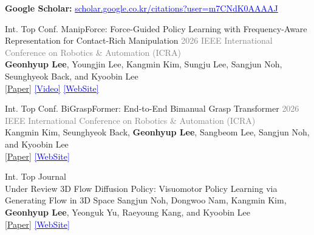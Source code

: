 \documentclass[9pt]{developercv} %
\begin{document}
\vspace{-10 pt} 
{\textbf{Google Scholar:} %
     \href{https://scholar.google.co.kr/citations?user=m7CNdK0AAAAJ\&hl=ko}%
     {\textcolor{blue}{scholar.google.co.kr/citations?user=m7CNdK0AAAAJ}}
\vspace{10 pt} 

\begin{entrylist}

    \entry
        {Int. Top Conf.}
        {ManipForce: Force-Guided Policy Learning with Frequency-Aware Representation for Contact-Rich Manipulation} 
        {}
        {\vspace{0pt}
        \textcolor{gray}{2026 IEEE International Conference on Robotics \& Automation (ICRA)} \\
        \textbf{Geonhyup Lee}, Youngjin Lee, Kangmin Kim, Sungju Lee, Sangjun Noh, Seunghyeok Back, and Kyoobin Lee \\
        \textcolor{blue}{\href{https://arxiv.org/abs/2509.19047?}{[Paper]}} 
        \href{https://youtu.be/AL4f7MfkI0g}{\textcolor{blue}{[Video]}}
        \href{https://sites.google.com/view/manipforce/}{\textcolor{blue}{[WebSite]}}
        }

    \entry
        {Int. Top Conf.}
        {BiGraspFormer: End-to-End Bimanual Grasp Transformer} 
        {}
        {\vspace{0pt}
        \textcolor{gray}{2026 IEEE International Conference on Robotics \& Automation (ICRA)} \\
        Kangmin Kim, Seunghyeok Back, \textbf{Geonhyup Lee}, Sangbeom Lee, Sangjun Noh, and Kyoobin Lee \\
       \textcolor{blue}{\href{https://arxiv.org/pdf/2509.19142}{[Paper]}} 
       \href{https://sites.google.com/view/bigraspformer}{\textcolor{blue}{[WebSite]}}
        }	

    \entry
        {Int. Top Journal\\Under Review}
        {3D Flow Diffusion Policy: Visuomotor Policy Learning via Generating Flow in 3D Space} 
        {}
        {\vspace{0pt}
        Sangjun Noh, Dongwoo Nam, Kangmin Kim, \textbf{Geonhyup Lee}, Yeonguk Yu, Raeyoung Kang, and Kyoobin Lee\\
       \textcolor{blue}{\href{https://arxiv.org/abs/2509.18676}{[Paper]}} 
       \href{https://sites.google.com/view/3dfdp/home}{\textcolor{blue}{[WebSite]}}
        }	
    

\end{entrylist}}
\end{document}
